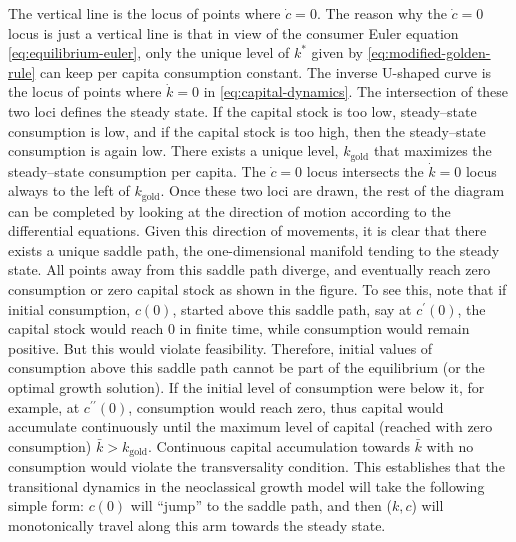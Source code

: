 \documentclass[\topdir/lecture\_notes.tex]{subfiles}
\begin{document}
The vertical line is the locus of points where \(\dot{c}=0\). The reason why the \(\dot{c}=0\) locus is just a vertical line is that in view of the consumer Euler equation \eqref{eq:equilibrium-euler}, only the unique level of \(k^{*}\) given by \eqref{eq:modified-golden-rule} can keep per capita consumption constant. The inverse U-shaped curve is the locus of points where \(\dot{k}=0\) in \eqref{eq:capital-dynamics}. The intersection of these two loci defines the steady state. If the capital stock is too low, steady--state consumption is low, and if the capital stock is too high, then the steady--state consumption is again low. There exists a unique level, \(k_{\text{gold}}\) that maximizes the steady--state consumption per capita. The \(\dot{c}=0\) locus intersects the \(\dot{k}=0\) locus always to the left of \(k_{\text{gold}}\). Once these two loci are drawn, the rest of the diagram can be completed by looking at the direction of motion according to the differential equations. Given this direction of movements, it is clear that there exists a unique saddle path, the one-dimensional manifold tending to the steady state. All points away from this saddle path diverge, and eventually reach zero consumption or zero capital stock as shown in the figure. To see this, note that if initial consumption, \(c(0)\), started above this saddle path, say at \(c^{\prime}(0)\), the capital stock would reach 0 in finite time, while consumption would remain positive. But this would violate feasibility. Therefore, initial values of consumption above this saddle path cannot be part of the equilibrium (or the optimal growth solution). If the initial level of consumption were below it, for example, at \(c^{\prime \prime}(0)\), consumption would reach zero, thus capital would accumulate continuously until the maximum level of capital (reached with zero consumption) \(\bar{k}>k_{\text{gold}}\). Continuous capital accumulation towards \(\bar{k}\) with no consumption would violate the transversality condition. This establishes that the transitional dynamics in the neoclassical growth model will take the following simple form: \(c(0)\) will ``jump'' to the saddle path, and then (\(k, c\)) will monotonically travel along this arm towards the steady state.
\end{document}
